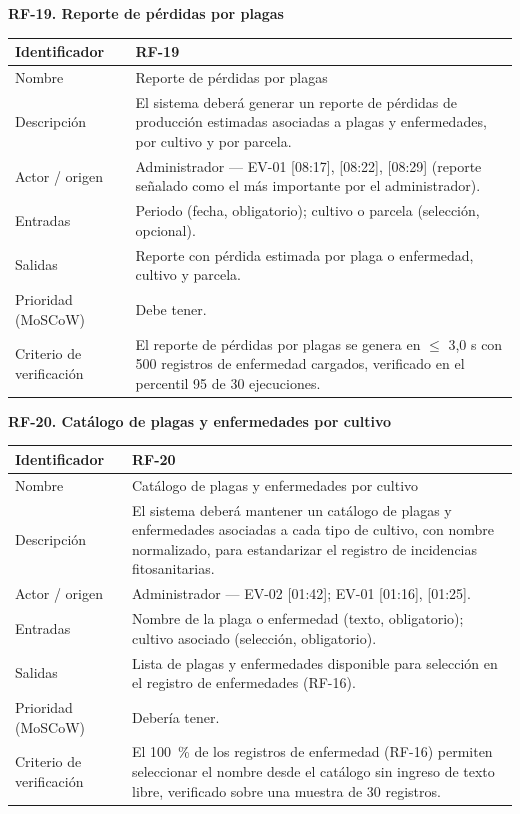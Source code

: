 \documentclass[12pt,a4paper]{article}
\begin{document}
\bigskip
\noindent\textbf{RF-19. Reporte de pérdidas por plagas}
\label{tab:RF-19}

\begin{center}
\begin{longtable}{|p{3.5cm}|p{10.7cm}|}
\hline
Identificador & RF-19 \\
\hline
Nombre & Reporte de pérdidas por plagas \\
\hline
Descripción & El sistema deberá generar un reporte de pérdidas de producción estimadas asociadas a plagas y enfermedades, por cultivo y por parcela. \\
\hline
Actor / origen & Administrador --- EV-01 [08:17], [08:22], [08:29] (reporte señalado como el más importante por el administrador). \\
\hline
Entradas & Periodo (fecha, obligatorio); cultivo o parcela (selección, opcional). \\
\hline
Salidas & Reporte con pérdida estimada por plaga o enfermedad, cultivo y parcela. \\
\hline
Prioridad (MoSCoW) & Debe tener. \\
\hline
Criterio de verificación & El reporte de pérdidas por plagas se genera en $\leq$ 3,0 s con 500 registros de enfermedad cargados, verificado en el percentil 95 de 30 ejecuciones. \\
\hline
\end{longtable}
\end{center}

\bigskip
\noindent\textbf{RF-20. Catálogo de plagas y enfermedades por cultivo}
\label{tab:RF-20}

\begin{center}
\begin{longtable}{|p{3.5cm}|p{10.7cm}|}
\hline
Identificador & RF-20 \\
\hline
Nombre & Catálogo de plagas y enfermedades por cultivo \\
\hline
Descripción & El sistema deberá mantener un catálogo de plagas y enfermedades asociadas a cada tipo de cultivo, con nombre normalizado, para estandarizar el registro de incidencias fitosanitarias. \\
\hline
Actor / origen & Administrador --- EV-02 [01:42]; EV-01 [01:16], [01:25]. \\
\hline
Entradas & Nombre de la plaga o enfermedad (texto, obligatorio); cultivo asociado (selección, obligatorio). \\
\hline
Salidas & Lista de plagas y enfermedades disponible para selección en el registro de enfermedades (RF-16). \\
\hline
Prioridad (MoSCoW) & Debería tener. \\
\hline
Criterio de verificación & El 100~\% de los registros de enfermedad (RF-16) permiten seleccionar el nombre desde el catálogo sin ingreso de texto libre, verificado sobre una muestra de 30 registros. \\
\hline
\end{longtable}
\end{center}
\end{document}
